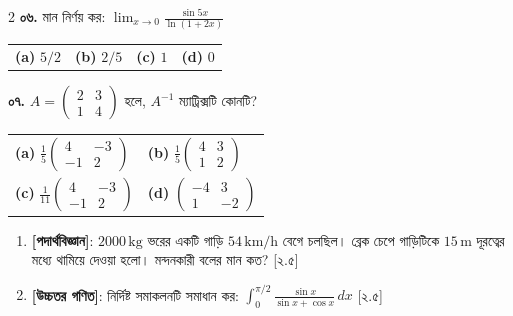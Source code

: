 \documentclass[11pt,oneside]{scrbook}
\newcommand{\choicefour}[4]{%
  \par\vspace{1pt}
  \begin{tabularx}{\linewidth}{XXXX}
    \textbf{(a)} #1 & \textbf{(b)} #2 & \textbf{(c)} #3 & \textbf{(d)} #4
  \end{tabularx}\par\vspace{1pt}
}
\newcommand{\choicetwo}[4]{%
  \par\vspace{1pt}
  \begin{tabularx}{\linewidth}{XX}
    \textbf{(a)} #1 & \textbf{(b)} #2 \\
    \textbf{(c)} #3 & \textbf{(d)} #4
  \end{tabularx}\par\vspace{1pt}
}
\begin{document}
\begin{multicols*}{2}
\textbf{০৬.} মান নির্ণয় কর: $\lim_{x \to 0} \frac{\sin 5x}{\ln(1 + 2x)}$
\choicefour{$5/2$}{$2/5$}{$1$}{$0$}

\textbf{০৭.} $A = \begin{pmatrix} 2 & 3 \\ 1 & 4 \end{pmatrix}$ হলে, $A^{-1}$ ম্যাট্রিক্সটি কোনটি?
\choicetwo{$\frac{1}{5}\begin{pmatrix} 4 & -3 \\ -1 & 2 \end{pmatrix}$}{$\frac{1}{5}\begin{pmatrix} 4 & 3 \\ 1 & 2 \end{pmatrix}$}{$\frac{1}{11}\begin{pmatrix} 4 & -3 \\ -1 & 2 \end{pmatrix}$}{$\begin{pmatrix} -4 & 3 \\ 1 & -2 \end{pmatrix}$}

\end{multicols*}

\vspace{6pt}
\begin{tcolorbox}[colback=WrittenPurple!5, colframe=WrittenPurple, arc=4pt, boxrule=1.2pt, title={\textbf{লিখিত অংশ (Written Test Paper) \textbar{} পূর্ণমান: ৪০ \textbar{} সময়: ৪৫ মিনিট}}]
    \begin{enumerate}[label=\textbf{\arabic*.}]
        \item \textbf{[পদার্থবিজ্ঞান]}: $2000\,\text{kg}$ ভরের একটি গাড়ি $54\,\text{km/h}$ বেগে চলছিল। ব্রেক চেপে গাড়িটিকে $15\,\text{m}$ দূরত্বের মধ্যে থামিয়ে দেওয়া হলো। মন্দনকারী বলের মান কত? \hfill [২.৫]
        \item \textbf{[উচ্চতর গণিত]}: নির্দিষ্ট সমাকলনটি সমাধান কর: $\int_{0}^{\pi/2} \frac{\sin x}{\sin x + \cos x} \, dx$ \hfill [২.৫]
    \end{enumerate}
\end{tcolorbox}

\newpage

\end{document}
